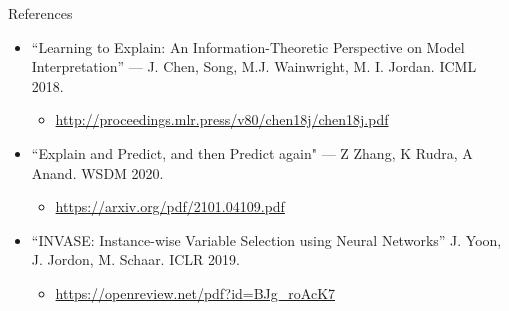 \documentclass[11pt,compress,t,notes=noshow, aspectratio=169, xcolor=table]{beamer}
\begin{document}
\begin{frame}[c]{References}
    \begin{itemize}
        \item “Learning to Explain: An Information-Theoretic Perspective on Model Interpretation” — J.
Chen, Song, M.J. Wainwright, M. I. Jordan. ICML 2018.
\begin{itemize}
    \item \url{http://proceedings.mlr.press/v80/chen18j/chen18j.pdf}
\end{itemize}
\bigskip
\item “Explain and Predict, and then Predict again" — Z Zhang, K Rudra, A Anand. WSDM 2020.
\begin{itemize}
    \item \url{https://arxiv.org/pdf/2101.04109.pdf}
\end{itemize}
\bigskip
\item “INVASE: Instance-wise Variable Selection using Neural Networks” J. Yoon, J. Jordon, M.
Schaar. ICLR 2019.
\begin{itemize}
    \item \url{https://openreview.net/pdf?id=BJg_roAcK7}
\end{itemize}
    \end{itemize}
\end{frame}
\endlecture
\end{document}
